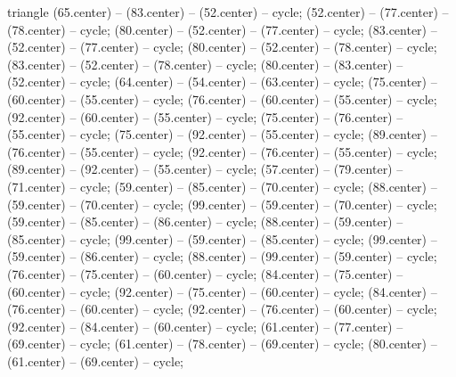 \begin{pgfonlayer}{triangle}
 (65.center) -- (83.center) -- (52.center) -- cycle; 
 (52.center) -- (77.center) -- (78.center) -- cycle; 
 (80.center) -- (52.center) -- (77.center) -- cycle; 
 (83.center) -- (52.center) -- (77.center) -- cycle; 
 (80.center) -- (52.center) -- (78.center) -- cycle; 
 (83.center) -- (52.center) -- (78.center) -- cycle; 
 (80.center) -- (83.center) -- (52.center) -- cycle; 
 (64.center) -- (54.center) -- (63.center) -- cycle; 
 (75.center) -- (60.center) -- (55.center) -- cycle; 
 (76.center) -- (60.center) -- (55.center) -- cycle; 
 (92.center) -- (60.center) -- (55.center) -- cycle; 
 (75.center) -- (76.center) -- (55.center) -- cycle; 
 (75.center) -- (92.center) -- (55.center) -- cycle; 
 (89.center) -- (76.center) -- (55.center) -- cycle; 
 (92.center) -- (76.center) -- (55.center) -- cycle; 
 (89.center) -- (92.center) -- (55.center) -- cycle; 
 (57.center) -- (79.center) -- (71.center) -- cycle; 
 (59.center) -- (85.center) -- (70.center) -- cycle; 
 (88.center) -- (59.center) -- (70.center) -- cycle; 
 (99.center) -- (59.center) -- (70.center) -- cycle; 
 (59.center) -- (85.center) -- (86.center) -- cycle; 
 (88.center) -- (59.center) -- (85.center) -- cycle; 
 (99.center) -- (59.center) -- (85.center) -- cycle; 
 (99.center) -- (59.center) -- (86.center) -- cycle; 
 (88.center) -- (99.center) -- (59.center) -- cycle; 
 (76.center) -- (75.center) -- (60.center) -- cycle; 
 (84.center) -- (75.center) -- (60.center) -- cycle; 
 (92.center) -- (75.center) -- (60.center) -- cycle; 
 (84.center) -- (76.center) -- (60.center) -- cycle; 
 (92.center) -- (76.center) -- (60.center) -- cycle; 
 (92.center) -- (84.center) -- (60.center) -- cycle; 
 (61.center) -- (77.center) -- (69.center) -- cycle; 
 (61.center) -- (78.center) -- (69.center) -- cycle; 
 (80.center) -- (61.center) -- (69.center) -- cycle; 

\end{pgfonlayer}
